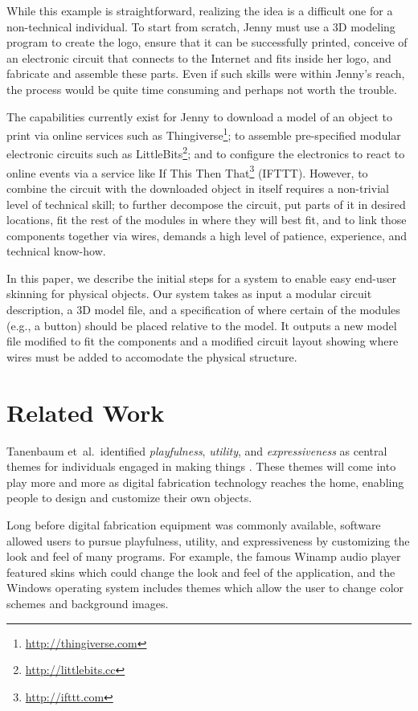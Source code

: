 \documentclass{chi-ext}
\begin{document}
	While this example is straightforward, realizing the idea is a
	difficult one for a non-technical individual. To start from scratch,
	Jenny must use a 3D modeling program to create the logo, ensure that
	it can be successfully printed, conceive of an electronic circuit
	that connects to the Internet and fits inside her logo, and
	fabricate and assemble these parts. Even if such skills were within
	Jenny's reach, the process would be quite time consuming and perhaps
	not worth the trouble.
	
	The capabilities currently exist for Jenny to download a model of an
	object to print via online services such as
	Thingiverse\footnote{\url{http://thingiverse.com}}; to assemble
	pre-specified modular electronic circuits such as
	LittleBits\footnote{\url{http://littlebits.cc}}; and to configure
	the electronics to react to online events via a service like If This
	Then That\footnote{\url{http://ifttt.com}} (IFTTT). However, to combine the
	circuit with the downloaded object in itself requires a non-trivial
	level of technical skill; to further decompose the circuit, put
	parts of it in desired locations, fit the rest of the modules in
	where they will best fit, and to link those components together via
	wires, demands a high level of patience, experience, and technical
	know-how.

	In this paper, we describe the initial steps for a system to enable
	easy end-user skinning for physical objects. Our system takes as
	input a modular circuit description, a 3D model file, and a
	specification of where certain of the modules (e.g., a button)
	should be placed relative to the model. It outputs a new model file
	modified to fit the components and a modified circuit layout showing
	where wires must be added to accomodate the physical structure.


\section{Related Work}
	Tanenbaum et~al.\ identified \textit{playfulness}, \textit{utility}, and
	\textit{expressiveness} as central themes for individuals engaged in
	making things \cite{Tanenbaum:2013ji}. These themes will come into
	play more and more as digital fabrication technology reaches the
	home, enabling people to design and customize their own objects.

	Long before digital fabrication equipment was commonly available,
	software allowed users to pursue playfulness, utility, and
	expressiveness by customizing the look and feel of many programs.
	For example, the famous Winamp audio player featured skins which
	could change the look and feel of the application,
	and the Windows operating system includes themes which allow the
	user to change color schemes and background images.
\end{document}
